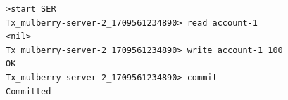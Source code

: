 \documentclass[varwidth]{standalone}
\begin{document}
\begin{verbatim}
>start SER
Tx_mulberry-server-2_1709561234890> read account-1
<nil>
Tx_mulberry-server-2_1709561234890> write account-1 100
OK
Tx_mulberry-server-2_1709561234890> commit
Committed
\end{verbatim}
\end{document}
